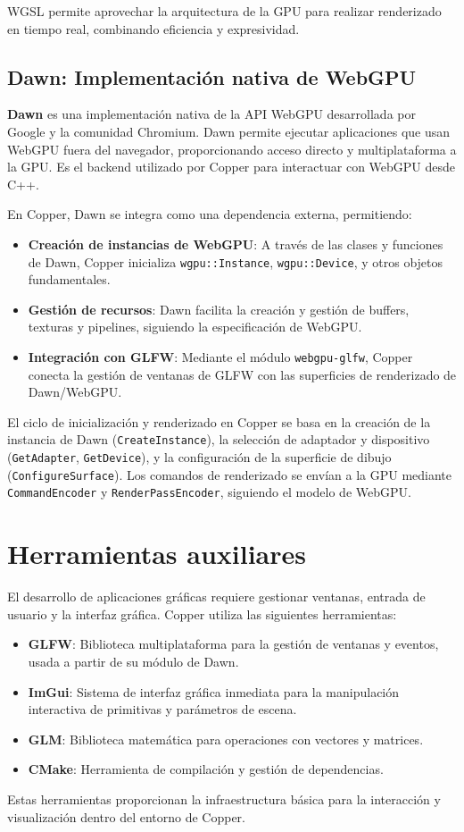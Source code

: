 WGSL permite aprovechar la arquitectura de la GPU para realizar renderizado en
tiempo real, combinando eficiencia y expresividad.

\subsection{Dawn: Implementación nativa de WebGPU}

\textbf{Dawn} es una implementación nativa de la API WebGPU desarrollada por Google y la comunidad Chromium\cite{dawn}. Dawn permite ejecutar aplicaciones que usan WebGPU fuera del navegador, proporcionando acceso directo y multiplataforma a la GPU. Es el backend utilizado por Copper para interactuar con WebGPU desde C++.

En Copper, Dawn se integra como una dependencia externa, permitiendo:

\begin{itemize}
    \item \textbf{Creación de instancias de WebGPU}: A través de las clases y funciones de Dawn, Copper inicializa \texttt{wgpu::Instance}, \texttt{wgpu::Device}, y otros objetos fundamentales.
    \item \textbf{Gestión de recursos}: Dawn facilita la creación y gestión de buffers, texturas y pipelines, siguiendo la especificación de WebGPU.
    \item \textbf{Integración con GLFW}: Mediante el módulo \texttt{webgpu-glfw}, Copper conecta la gestión de ventanas de GLFW con las superficies de renderizado de Dawn/WebGPU.
\end{itemize}

El ciclo de inicialización y renderizado en Copper se basa en la creación de la
instancia de Dawn (\texttt{CreateInstance}), la selección de adaptador y
dispositivo (\texttt{GetAdapter}, \texttt{GetDevice}), y la configuración de la
superficie de dibujo (\texttt{ConfigureSurface}). Los comandos de renderizado
se envían a la GPU mediante \texttt{CommandEncoder} y
\texttt{RenderPassEncoder}, siguiendo el modelo de WebGPU.

\section{Herramientas auxiliares}

El desarrollo de aplicaciones gráficas requiere gestionar ventanas, entrada de
usuario y la interfaz gráfica. Copper utiliza las siguientes herramientas:

\begin{itemize}
    \item \textbf{GLFW}: Biblioteca multiplataforma para la gestión de ventanas y eventos, usada a partir de su módulo de Dawn\cite{glfw-docs}.
    \item \textbf{ImGui}: Sistema de interfaz gráfica inmediata para la manipulación interactiva de primitivas y parámetros de escena\cite{imgui}.
    \item \textbf{GLM}: Biblioteca matemática para operaciones con vectores y matrices\cite{glm}.
    \item \textbf{CMake}: Herramienta de compilación y gestión de dependencias\cite{cmake-docs}.
\end{itemize}

Estas herramientas proporcionan la infraestructura básica para la interacción y
visualización dentro del entorno de Copper.